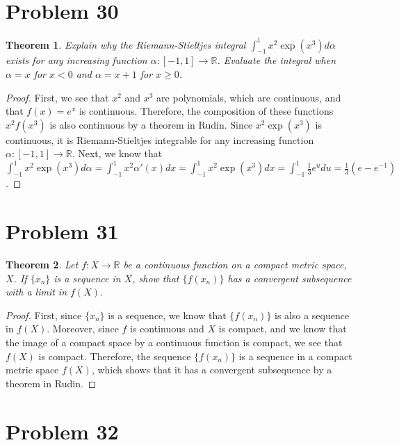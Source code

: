 \documentclass[psamsfonts]{amsart}
\newtheorem{thm}{Theorem}[section]
\theoremstyle{definition}
\theoremstyle{remark}
\numberwithin{equation}{section}
\begin{document}
\section{Problem 30} 

\begin{thm}
Explain why the Riemann-Stieltjes integral $\int_{-1}^1 x^2 \exp(x^3) d\alpha$ exists for any increasing function $\alpha: [-1,1] \to \mathbb{R}$. Evaluate the integral when $\alpha = x$ for $x < 0$ and $\alpha = x+1$ for $x \geq 0$. 
\end{thm}

\begin{proof}
First, we see that $x^2$ and $x^3$ are polynomials, which are continuous, and that $f(x) = e^x$ is continuous. Therefore, the composition of these functions $x^2 f(x^3)$ is also continuous by a theorem in Rudin. Since $x^2 \exp(x^3)$ is continuous, it is Riemann-Stieltjes integrable for any increasing function $\alpha: [-1,1] \to \mathbb{R}$. Next, we know that $\int_{-1}^1 x^2 \exp ( x^3 ) d \alpha = \int_{-1}^1 x^2 \alpha ' (x) dx = \int_{-1}^1 x^2 \exp(x^3) dx = \int_{-1}^1 \frac{1}{3} e^u du = \frac{1}{3} ( e - e^{-1})$. 
\end{proof}

\section{Problem 31}

\begin{thm}
Let $f: X \to \mathbb{R}$ be a continuous function on a compact metric space, $ X$. If $\{ x_n \}$ is a sequence in $X$, show that $\{ f(x_n) \}$ has a convergent subsequence with a limit in $f(X)$. 
\end{thm}

\begin{proof}
First, since $\{ x_n \}$ is a sequence, we know that $\{ f(x_n) \}$ is also a sequence in $f(X)$. Moreover, since $f$ is continuous and $X$ is compact, and we know that the image of a compact space by a continuous function is compact, we see that $f(X)$ is compact. Therefore, the sequence $\{ f(x_n ) \}$ is a sequence in a compact metric space $f(X)$, which shows that it has a convergent subsequence by a theorem in Rudin.
\end{proof}

\section{Problem 32}
\end{document}
